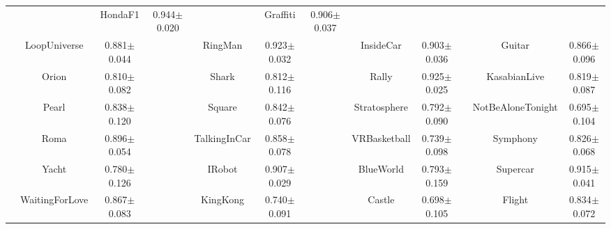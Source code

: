 \documentclass[10pt,journal,compsoc]{IEEEtran}
\begin{document}
\begin{table}
\begin{center}
{\begin{tabular}{*{4}{|c|c|c}|}
& & HondaF1 & 0.944$\pm$0.020

& & Graffiti & 0.906$\pm$0.037

\\
   

 & LoopUniverse & 0.881$\pm$0.044

& & RingMan & 0.923$\pm$0.032

& & InsideCar & 0.903$\pm$0.036

& & Guitar & 0.866$\pm$0.096

\\
   

 & Orion & 0.810$\pm$0.082

& & Shark & 0.812$\pm$0.116

& & Rally & 0.925$\pm$0.025

& & KasabianLive & 0.819$\pm$0.087

\\
   

 & Pearl & 0.838$\pm$0.120

& & Square & 0.842$\pm$0.076

& & Stratosphere & 0.792$\pm$0.090

& & NotBeAloneTonight & 0.695$\pm$0.104

\\
   

 & Roma & 0.896$\pm$0.054

& & TalkingInCar & 0.858$\pm$0.078

& & VRBasketball & 0.739$\pm$0.098

& & Symphony & 0.826$\pm$0.068
 \\
  \hline
  & Yacht & 0.780$\pm$0.126
&
  & IRobot & 0.907$\pm$0.029
&
  & BlueWorld & 0.793$\pm$0.159
&
  & Supercar & 0.915$\pm$0.041
\\
   

 & WaitingForLove & 0.867$\pm$0.083

& & KingKong & 0.740$\pm$0.091

& & Castle & 0.698$\pm$0.105

& & Flight & 0.834$\pm$0.072

\\
   


\end{tabular}}
\end{center}
\end{table}
\end{document}
